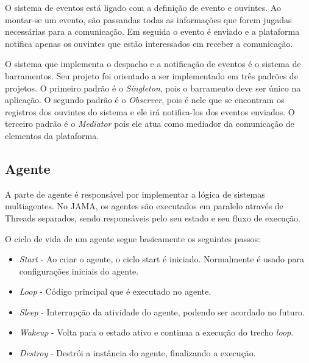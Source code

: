 O sistema de eventos está ligado com a definição de evento e ouvintes. Ao montar-se um evento, são passandas todas as informações que forem jugadas necessárias para a comunicação. Em seguida o evento é enviado e a plataforma notifica apenas os ouvintes que estão interessados em receber a comunicação.

O sistema que implementa o despacho e a notificação de eventos é o sistema de barramentos. Seu projeto foi orientado a ser implementado em três padrões de projetos. O primeiro padrão é o \emph{Singleton}, pois o barramento deve ser único na aplicação. O segundo padrão é o \emph{Observer}, pois é nele que se encontram os registros dos ouvintes do sistema e ele irá notifica-los dos eventos enviados. O terceiro padrão é o \emph{Mediator} pois ele atua como mediador da comunicação de elementos da plataforma.

\subsection{Agente}

A parte de agente é responsável por implementar a lógica de sistemas multiagentes. No JAMA, os agentes são executados em paralelo através de Threads separados, sendo responsáveis pelo seu estado e seu fluxo de execução.

O ciclo de vida de um agente segue basicamente os seguintes passos:

\begin{itemize}
	\item \emph{Start} - Ao criar o agente, o ciclo start é iniciado. Normalmente é usado para configurações iniciais do agente.
	\item \emph{Loop} - Código principal que é executado no agente.
	\item \emph{Sleep} - Interrupção da atividade do agente, podendo ser acordado no futuro.
	\item \emph{Wakeup} - Volta para o estado ativo e continua a execução do trecho \emph{loop}.
	\item \emph{Destroy} - Destrói a instância do agente, finalizando a execução.
\end{itemize}


